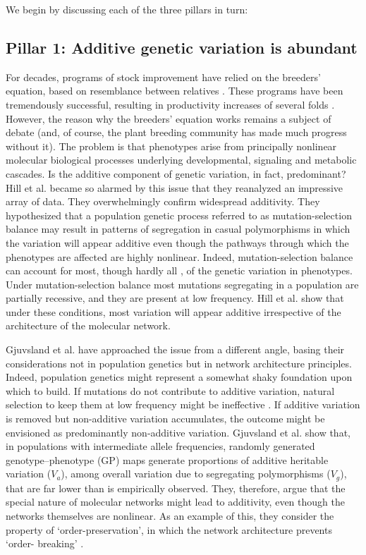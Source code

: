 We begin by discussing each of the three pillars in turn:

\subsection{Pillar 1: Additive genetic variation is abundant}

For decades, programs of stock improvement have relied on the breeders' equation, based on resemblance between relatives \cite{Lynch1998}. These programs have been tremendously successful, resulting in productivity increases of several folds \cite{Falconer1996}. However, the reason why the breeders' equation works remains a subject of debate (and, of course, the plant breeding community has made much progress without it). The problem is that phenotypes arise from principally nonlinear molecular biological processes underlying developmental, signaling and metabolic cascades. Is the additive component of genetic variation, in fact, predominant? Hill et al. \cite{Hill2008} became so alarmed by this issue that they reanalyzed an impressive array of data. They overwhelmingly confirm widespread additivity. They hypothesized that a population genetic process referred to as mutation-selection balance may result in patterns of segregation in casual polymorphisms in which the variation will appear additive even though the pathways through which the phenotypes are affected are highly nonlinear. Indeed, mutation-selection balance can account for most, though hardly all \cite{Houle1998}, of the genetic variation in phenotypes. Under mutation-selection balance most mutations segregating in a population are partially recessive, and they are present at low frequency. Hill et al. \cite{Hill2008} show that under these conditions, most variation will appear additive irrespective of the architecture of the molecular network.

Gjuvsland et al. \cite{Gjuvsland2011} have approached the issue from a different angle, basing their considerations not in population genetics but in network architecture principles. Indeed, population genetics might represent a somewhat shaky foundation upon which to build. If mutations do not contribute to additive variation, natural selection to keep them at low frequency might be ineffective \cite{Charlesworth1996}. If additive variation is removed but non-additive variation accumulates, the outcome might be envisioned as predominantly non-additive variation. Gjuvsland et al. \cite{Gjuvsland2011} show that, in populations with intermediate allele frequencies, randomly generated genotype–phenotype (GP) maps generate proportions of additive heritable variation ($V_a$), among overall variation due to segregating polymorphisms ($V_g$), that are far lower than is empirically observed. They, therefore, argue that the special nature of molecular networks might lead to additivity, even though the networks themselves are nonlinear. As an example of this, they consider the property of `order-preservation', in which the network architecture prevents `order- breaking' \cite{Gjuvsland2011}.


